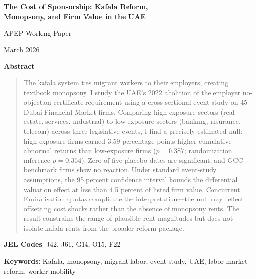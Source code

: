 \documentclass[12pt]{article}
\begin{document}

\begin{titlepage}
\begin{center}

\vspace*{0.5cm}

{\LARGE\textbf{The Cost of Sponsorship: Kafala Reform,\\[6pt] Monopsony, and Firm Value in the UAE}}

\vspace{1.2cm}

{\large APEP Working Paper}

\vspace{0.6cm}

{\large March 2026}

\vspace{1.5cm}

\textbf{Abstract}

\end{center}

\begin{quote}
\noindent The kafala system ties migrant workers to their employers, creating textbook monopsony. I study the UAE's 2022 abolition of the employer no-objection-certificate requirement using a cross-sectional event study on 45 Dubai Financial Market firms. Comparing high-exposure sectors (real estate, services, industrial) to low-exposure sectors (banking, insurance, telecom) across three legislative events, I find a precisely estimated null: high-exposure firms earned 3.59 percentage points higher cumulative abnormal returns than low-exposure firms ($p = 0.387$; randomization inference $p = 0.354$). Zero of five placebo dates are significant, and GCC benchmark firms show no reaction. Under standard event-study assumptions, the 95 percent confidence interval bounds the differential valuation effect at less than 4.5 percent of listed firm value. Concurrent Emiratisation quotas complicate the interpretation---the null may reflect offsetting cost shocks rather than the absence of monopsony rents. The result constrains the range of plausible rent magnitudes but does not isolate kafala rents from the broader reform package.
\end{quote}

\vspace{0.5cm}

\noindent\textbf{JEL Codes:} J42, J61, G14, O15, F22

\vspace{0.3cm}

\noindent\textbf{Keywords:} Kafala, monopsony, migrant labor, event study, UAE, labor market reform, worker mobility

\end{titlepage}
\end{document}

